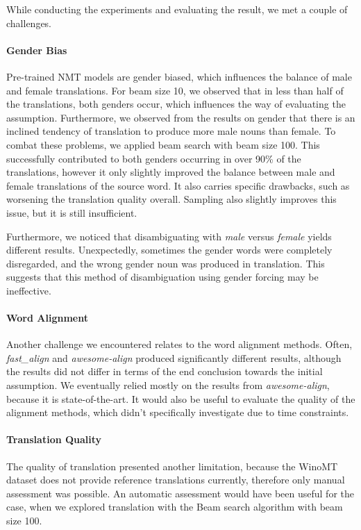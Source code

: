 While conducting the experiments and evaluating the result, we met a couple of challenges.

\paragraph{Gender Bias}
Pre-trained NMT models are gender biased, which influences the balance of male and female translations. For beam size 10, we observed that in less than half of the translations, both genders occur, which influences the way of evaluating the assumption. Furthermore, we observed from the results on gender that there is an inclined tendency of translation to produce more male nouns than female. To combat these problems, we applied beam search with beam size 100. This successfully contributed to both genders occurring in over 90\% of the translations, however it only slightly improved the balance between male and female translations of the source word. It also carries specific drawbacks, such as worsening the translation quality overall. Sampling also slightly improves this issue, but it is still insufficient.

Furthermore, we noticed that disambiguating with \textit{male} versus \textit{female} yields different results. Unexpectedly, sometimes the gender words were completely disregarded, and the wrong gender noun was produced in translation. This suggests that this method of disambiguation using gender forcing may be ineffective.

\paragraph{Word Alignment}
Another challenge we encountered relates to the word alignment methods. Often, \textit{fast\_align} and \textit{awesome-align} produced significantly different results, although the results did not differ in terms of the end conclusion towards the initial assumption. We eventually relied mostly on the results from \textit{awesome-align}, because it is state-of-the-art. It would also be useful to evaluate the quality of the alignment methods, which didn't specifically investigate due to time constraints.

\paragraph{Translation Quality}
The quality of translation presented another limitation, because the WinoMT dataset does not provide reference translations currently, therefore only manual assessment was possible. An automatic assessment would have been useful for the case, when we explored translation with the Beam search algorithm with beam size 100.

